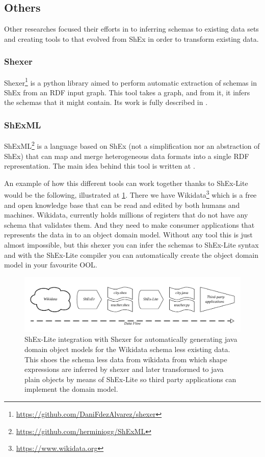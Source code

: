 \subsection{Others}
Other researches focused their efforts in to inferring schemas to existing data sets and creating tools to that
evolved from ShEx in order to transform existing data.

\subsubsection{Shexer}
Shexer\footnote{\url{https://github.com/DaniFdezAlvarez/shexer}} is a python library aimed to perform
automatic extraction of schemas in ShEx from an RDF input graph. This tool takes a graph, and from it, it infers the
schemas that it might contain. Its work is fully described in \cite{iovka-auto-shex-shacl, fernandez2016inference}.

\subsubsection{ShExML}
ShExML\footnote{\url{https://github.com/herminiogg/ShExML}} is a language based on ShEx (not a simplification nor
an abstraction of ShEx) that can map and merge heterogeneous data formats into a single RDF representation.
The main idea behind this tool is written at \cite{shexml}.

\bigskip

An example of how this different tools can work together thanks to ShEx-Lite would be the following, illustrated
at \cref{fig:shex-lite-shexer-integration}. There we have Wikidata\footnote{\url{https://www.wikidata.org}} which
is a free and open knowledge base that can be read and edited by both humans and machines.
Wikidata, currently holds millions of registers that do not have any schema that validates them. And they need to
make consumer applications that represents the data in to an object domain model. Without any tool this is just almost impossible,
but this shexer you can infer the schemas to ShEx-Lite syntax and with the ShEx-Lite compiler you can automatically
create the object domain model in your favourite OOL.

\begin{figure}
    \includegraphics[width=\textwidth]{images/shex-lite-shexer-integration.png}
    \centering
    \caption[ShEx-Lite integration with Shexer]{ShEx-Lite integration with Shexer for automatically generating
    java domain object models for the Wikidata schema less existing data. This shoes the schema less data from
    wikidata from which shape expressions are inferred by shexer and later transformed to java plain objects by
    means of ShEx-Lite so third party applications can implement the domain model.}
	\label{fig:shex-lite-shexer-integration}
\end{figure}